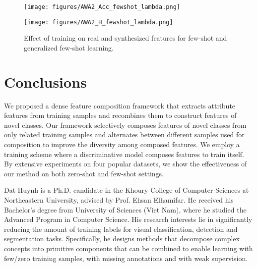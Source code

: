 \documentclass[10pt,journal,compsoc]{IEEEtran}
\newcommand{\1}{\boldsymbol{1}}
\newcommand{\0}{\boldsymbol{0}}
\newcommand{\<}{\langle}
\renewcommand{\>}{\rangle}
\begin{document}
\begin{figure}[t!]
\centering
\begin{minipage}[b]{0.45\linewidth}
  \texttt{[image: figures/AWA2\_Acc\_fewshot\_lambda.png]}
  \vspace{-1mm}
\end{minipage}
\begin{minipage}[b]{0.45\linewidth}
  \texttt{[image: figures/AWA2\_H\_fewshot\_lambda.png]}
    \vspace{-1mm}
\end{minipage}
\caption{Effect of training on real and synthesized features for few-shot and generalized few-shot learning.}
\label{fig:few_shot_performance}
\end{figure}


\section{Conclusions}
\label{sec:conclusions}
We proposed a dense feature composition framework that extracts attribute features from training samples and recombines them to construct features of novel classes. Our framework selectively composes features of novel classes from only related training samples and alternates between different samples used for composition to improve the diversity among composed features. We employ a training scheme where a discriminative model composes features to train itself. By extensive experiments on four popular datasets, we show the effectiveness of our method on both zero-shot and few-shot settings.


{\small


}

\begin{IEEEbiography}{Dat Huynh} is a Ph.D. candidate in the Khoury College of Computer Sciences at Northeastern University, advised by Prof. Ehsan Elhamifar. He received his Bachelor's degree from University of Sciences (Viet Nam), where he studied the Advanced Program in Computer Science.
His research interests lie in significantly reducing the amount of training labels for visual classification, detection and segmentation tasks. Specifically, he designs methods that decompose complex concepts into primitive components that can be combined to enable learning with few/zero training samples, with missing annotations and with weak supervision.
\end{IEEEbiography}
\end{document}
